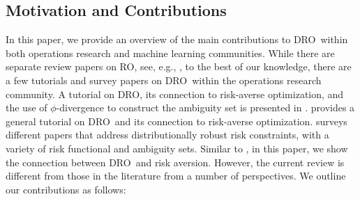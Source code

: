 \documentclass[final,onefignum,onetabnum]{class}
\newcommand{\dro}{DRO}
\begin{document}
\subsection{Motivation and Contributions}
In this paper, we provide an overview of the main contributions to \dro\ within both operations research and machine learning communities. While there are separate review papers on RO, see, e.g., \cite{bertsimas2011REV,gabrel2014,gorissen2015}, to the best of our knowledge, there are a few tutorials and survey papers on \dro\ within the operations research community. A tutorial on \dro, its connection to risk-averse optimization, and the use of $\phi$-divergence to construct the ambiguity set is presented in \citet{bayraksan2015}. \citet{shapiro2018tutorial} provides a general tutorial on \dro\ and its  connection to risk-averse optimization. \citet{postek2016} surveys different papers that address distributionally robust risk constraints, with a variety of risk functional and ambiguity sets. Similar to \cite{bayraksan2015,shapiro2018tutorial,postek2016}, in this paper, we show the connection between \dro\ and risk aversion. However, the current review is different from those in the literature from a number of perspectives. 
We outline our contributions as follows:
\end{document}

